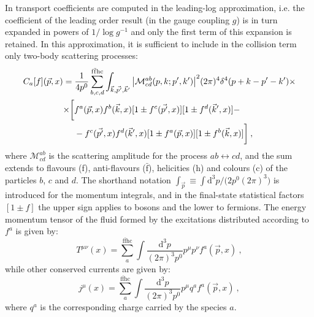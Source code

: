 In \cite{Arnold:2000dr} transport coefficients are computed in the leading-log approximation, i.e. the coefficient of the leading order result (in the gauge coupling $g$) is in turn expanded in powers of $1/\log{g^{-1}}$ and only the first term of this expansion is retained. In this approximation, it is sufficient to include in the collision term only two-body scattering processes:
\begin{equation}
\begin{split}
C_a[f](\vec p, x)  & = \frac{1}{4 p^0} \sum_{b,c,d}^{\mathrm{f \bar f h c}} \int_{\vec k, \vec{p'}, \vec k'} \abs{\mathcal M^{ab}_{cd}(p,k;p',k')}^2 (2 \pi)^4 \delta^4(p+k-p'-k') \times \\
& 
\begin{split}
\times  \biggl[ & f^a(\vec p,x) f^b(\vec k,x) [1 \pm f^c(\vec{p'},x)] [1 \pm f^d(\vec k',x)] - \\ 
& - f^c(\vec{p'},x) f^d(\vec k',x)[1 \pm f^a(\vec p,x)] [1 \pm f^b(\vec k,x)] \biggr]  \: ,
\end{split}
\end{split}
\end{equation}
%
where $\mathcal{M}^{ab}_{cd}$ is the scattering amplitude for the process $ab \leftrightarrow cd$, and the sum extends to flavours (f), anti-flavours ($\mathrm{\bar f}$), helicities (h) and colours (c) of the particles $b$, $c$ and $d$. The shorthand notation $\int_{\vec p} \equiv \int \mathrm{d}^3p/\bigl(2p^0 (2 \pi)^3\bigr)$ is introduced for the momentum integrals, and in the final-state statistical factors $[1 \pm f]$ the upper sign applies to bosons and the lower to fermions. 
The energy momentum tensor of the fluid formed by the excitations distributed according to $f^a$ is given by:
\begin{equation}
T^{\mu\nu}(x) = \sum_a^{\mathrm{f \bar f h c}} \int \frac{\mathrm d^3 p}{(2 \pi)^3 p^0} p^{\mu} p^{\nu} f^a(\vec p, x) \: ,
\label{Tmunu_kinetic}
\end{equation}
%
while other conserved currents are given by:
\begin{equation}
j^{\mu}(x) = \sum_a^{\mathrm{f \bar f h c}}\int \frac{\mathrm d^3 p}{(2 \pi)^3 p^0} p^{\mu} q^a f^a(\vec p, x) \: ,
\label{jmu_kinetic}
\end{equation}
%
where $q^a$ is the corresponding charge carried by the species $a$.



